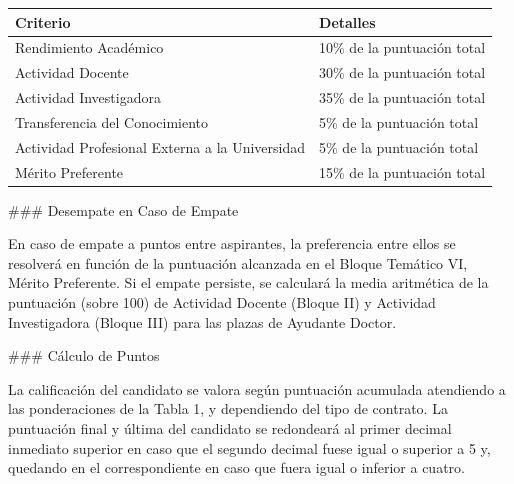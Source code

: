 \documentclass{article}
\begin{document}
\begin{itemize}
\begin{itemize}
                        \vspace{0.4cm}
                        \begin{table}[h!]\centering\renewcommand{\arraystretch}{1.3}
                              \begin{tabular}{|p{}|p{}|}\hline
                                    Criterio                                       & Detalles                    \\\hline
                                    Rendimiento Académico                          & 10\% de la puntuación total \\\hline
                                    Actividad Docente                              & 30\% de la puntuación total \\\hline
                                    Actividad Investigadora                        & 35\% de la puntuación total \\\hline
                                    Transferencia del Conocimiento                 & 5\% de la puntuación total  \\\hline
                                    Actividad Profesional Externa a la Universidad & 5\% de la puntuación total  \\\hline
                                    Mérito Preferente                              & 15\% de la puntuación total \\\hline
                              \end{tabular}\end{table}
                        \vspace{0.4cm}

                        \#\#\# Desempate en Caso de Empate

                        En caso de empate a puntos entre aspirantes, la preferencia entre ellos se resolverá en función de la puntuación alcanzada en el Bloque Temático VI, Mérito Preferente. Si el empate persiste, se calculará la media aritmética de la puntuación (sobre 100) de Actividad Docente (Bloque II) y Actividad Investigadora (Bloque III) para las plazas de Ayudante Doctor.

                        \#\#\# Cálculo de Puntos

                        La calificación del candidato se valora según puntuación acumulada atendiendo a las ponderaciones de la Tabla 1, y dependiendo del tipo de contrato. La puntuación final y última del candidato se redondeará al primer decimal inmediato superior en caso que el segundo decimal fuese igual o superior a 5 y, quedando en el correspondiente en caso que fuera igual o inferior a cuatro.


\end{itemize}
\end{itemize}
\end{document}
